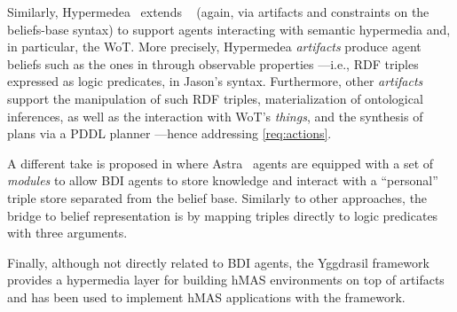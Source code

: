 Similarly, 
Hypermedea~\cite{DBLP:conf/www/CharpenayZLB22} extends \jacamo{}~\cite{BOISSIER2013747}
(again, via artifacts and constraints on the beliefs-base syntax)
to support agents interacting with semantic hypermedia and, in particular, the \ac{WoT}.
%
More precisely,
Hypermedea \emph{artifacts} produce agent beliefs such as the ones in 
through observable properties%
---i.e., \ac{RDF} triples expressed as logic predicates,
in Jason's syntax.
%
Furthermore, 
other \emph{artifacts} support the manipulation of such \ac{RDF} triples,
materialization of ontological inferences,
as well as the interaction with \acs{WoT}'s \emph{things},
and the synthesis of plans via a PDDL planner%
---hence addressing \ref{req:actions}.
%


A different take is proposed in \cite{DBLP:conf/semweb/ONeillBBC21}
where Astra~\cite{CollierRL15} agents are equipped with a set of \emph{modules} to allow \ac{BDI} agents to store knowledge and interact with a ``personal'' triple store separated from the belief base.
Similarly to other approaches,
the bridge to belief representation is by mapping triples directly to logic predicates with three arguments.

Finally, although not directly related to \ac{BDI} agents, 
the Yggdrasil framework~\cite{DBLP:conf/emas/CiorteaBR18} provides a hypermedia layer for building \ac{hMAS} environments on top of \cartago{} artifacts
and has been used to implement \ac{hMAS} applications with the \jacamo{} framework.

